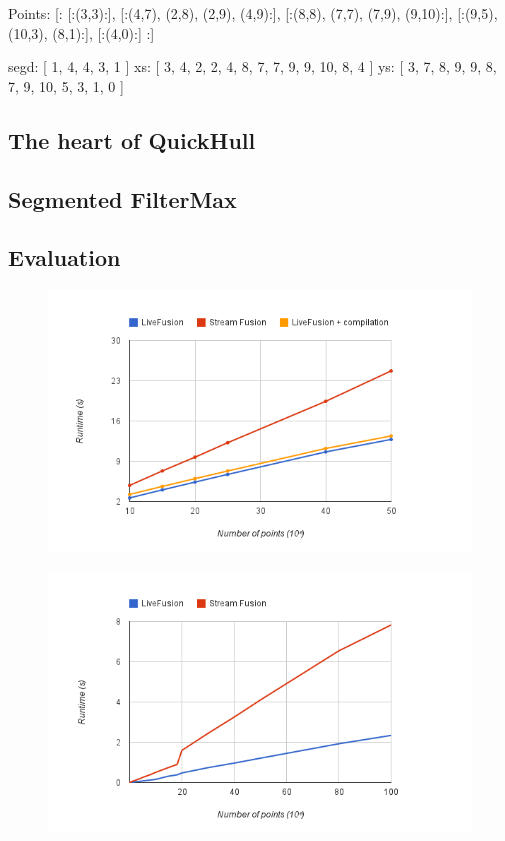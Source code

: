 \documentclass[preamble.tex]{subfiles}
\begin{document}
\begin{hscode}
Points:
  [:
     [:(3,3):],
     [:(4,7), (2,8),  (2,9), (4,9):],
     [:(8,8), (7,7),  (7,9), (9,10):],
     [:(9,5), (10,3), (8,1):],
     [:(4,0):]
  :]


segd: [ 1, 4, 4, 3, 1 ]
xs:   [ 3, 4, 2, 2, 4, 8, 7, 7,  9, 9, 10, 8, 4 ]
ys:   [ 3, 7, 8, 9, 9, 8, 7, 9, 10, 5,  3, 1, 0 ]
\end{hscode}


\subsection{The heart of QuickHull}

\subsection{Segmented FilterMax}

\subsection{Evaluation}

\begin{figure}
\includegraphics[center]{img/Eval-QuickHull}
\end{figure}

\begin{figure}
\includegraphics[center]{img/Eval-FarAndAboves}
\end{figure}
\end{document}
